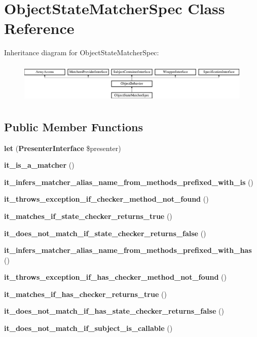 \section{Object\+State\+Matcher\+Spec Class Reference}
\label{classspec_1_1_php_spec_1_1_matcher_1_1_object_state_matcher_spec}
Inheritance diagram for Object\+State\+Matcher\+Spec\+:\begin{figure}[H]
\begin{center}
\leavevmode
\includegraphics[height=1.953488cm]{classspec_1_1_php_spec_1_1_matcher_1_1_object_state_matcher_spec}
\end{center}
\end{figure}
\subsection*{Public Member Functions}
\begin{DoxyCompactItemize}
\item 
{\bf let} ({\bf Presenter\+Interface} \$presenter)
\item 
{\bf it\+\_\+is\+\_\+a\+\_\+matcher} ()
\item 
{\bf it\+\_\+infers\+\_\+matcher\+\_\+alias\+\_\+name\+\_\+from\+\_\+methods\+\_\+prefixed\+\_\+with\+\_\+is} ()
\item 
{\bf it\+\_\+throws\+\_\+exception\+\_\+if\+\_\+checker\+\_\+method\+\_\+not\+\_\+found} ()
\item 
{\bf it\+\_\+matches\+\_\+if\+\_\+state\+\_\+checker\+\_\+returns\+\_\+true} ()
\item 
{\bf it\+\_\+does\+\_\+not\+\_\+match\+\_\+if\+\_\+state\+\_\+checker\+\_\+returns\+\_\+false} ()
\item 
{\bf it\+\_\+infers\+\_\+matcher\+\_\+alias\+\_\+name\+\_\+from\+\_\+methods\+\_\+prefixed\+\_\+with\+\_\+has} ()
\item 
{\bf it\+\_\+throws\+\_\+exception\+\_\+if\+\_\+has\+\_\+checker\+\_\+method\+\_\+not\+\_\+found} ()
\item 
{\bf it\+\_\+matches\+\_\+if\+\_\+has\+\_\+checker\+\_\+returns\+\_\+true} ()
\item 
{\bf it\+\_\+does\+\_\+not\+\_\+match\+\_\+if\+\_\+has\+\_\+state\+\_\+checker\+\_\+returns\+\_\+false} ()
\item 
{\bf it\+\_\+does\+\_\+not\+\_\+match\+\_\+if\+\_\+subject\+\_\+is\+\_\+callable} ()
\end{DoxyCompactItemize}
